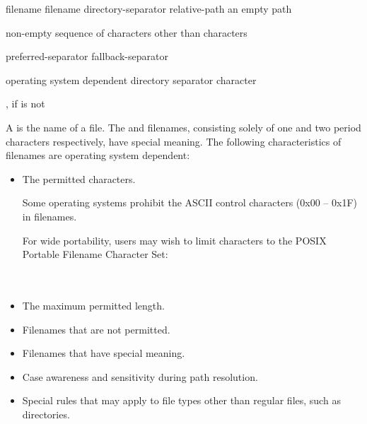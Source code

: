 \begin{ncbnf}
\br
    filename\br
    filename directory-separator relative-path\br
    \textnormal{an empty path}
\end{ncbnf}

\begin{ncbnf}
\br
    \textnormal{non-empty sequence of characters other than  characters}
\end{ncbnf}

\begin{ncbnf}
\br
    preferred-separator \br
    fallback-separator 
\end{ncbnf}

\begin{ncbnf}
\br
    \textnormal{operating system dependent directory separator character}
\end{ncbnf}

\begin{ncbnf}
\br
    \textnormal{\tcode{/}, if  is not \tcode{/}}
\end{ncbnf}

\pnum
A  is
the name of a file. The  and  filenames,
consisting solely of one and two period characters respectively,
have special meaning.
The following characteristics of filenames are operating system dependent:
\begin{itemize}
\item The permitted characters.
\begin{example}
Some operating systems prohibit
      the ASCII control characters (0x00 -- 0x1F) in filenames.
\end{example}
\begin{note}
For wide portability, users may wish to limit 
characters to the POSIX Portable Filename Character Set: \\
 \\
 \\
\end{note}
\item The maximum permitted length.
\item Filenames that are not permitted.
\item Filenames that have special meaning.
\item Case awareness and sensitivity during path resolution.
\item Special rules that may apply to file types other than regular
  files, such as directories.
\end{itemize}

